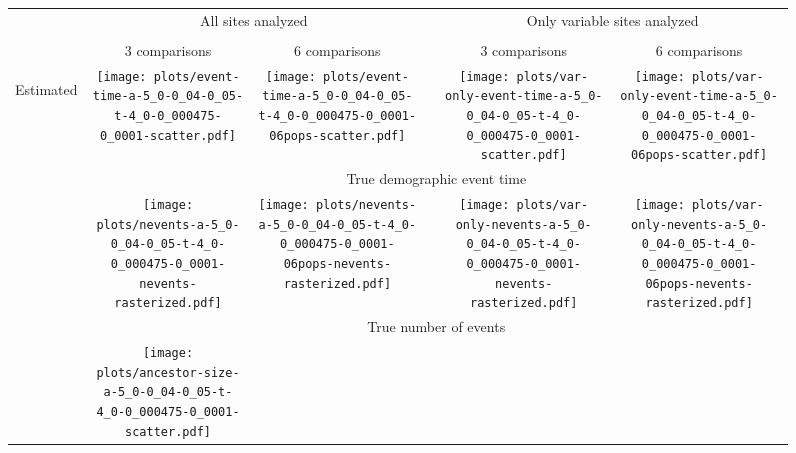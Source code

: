 \documentclass[border=10pt,varwidth=30cm]{standalone}
\begin{document}
\begin{figure}
    \centering
    \begin{tabular}{@{}cccccc@{}}
        & \multicolumn{2}{c}{\Large All sites analyzed}
        &
        & \multicolumn{2}{c}{\Large Only variable sites analyzed} \\
        \cline{2-3}\cline{5-6}
        & & & & & \\
        & \multicolumn{1}{c}{\large 3 comparisons}
        & \multicolumn{1}{c}{\large 6 comparisons}
        &
        & \multicolumn{1}{c}{\large 3 comparisons}
        & \multicolumn{1}{c}{\large 6 comparisons} \\
        \multirow{8}{*}[-9em]{\begin{sideways}\large Estimated\end{sideways}}
        & \texttt{[image: plots/event-time-a-5\_0-0\_04-0\_05-t-4\_0-0\_000475-0\_0001-scatter.pdf]}
        & \texttt{[image: plots/event-time-a-5\_0-0\_04-0\_05-t-4\_0-0\_000475-0\_0001-06pops-scatter.pdf]}
        &
        & \texttt{[image: plots/var-only-event-time-a-5\_0-0\_04-0\_05-t-4\_0-0\_000475-0\_0001-scatter.pdf]}
        & \texttt{[image: plots/var-only-event-time-a-5\_0-0\_04-0\_05-t-4\_0-0\_000475-0\_0001-06pops-scatter.pdf]} \\
        & \multicolumn{5}{c}{\large True demographic event time} \\
        & \texttt{[image: plots/nevents-a-5\_0-0\_04-0\_05-t-4\_0-0\_000475-0\_0001-nevents-rasterized.pdf]}
        & \texttt{[image: plots/nevents-a-5\_0-0\_04-0\_05-t-4\_0-0\_000475-0\_0001-06pops-nevents-rasterized.pdf]}
        &
        & \texttt{[image: plots/var-only-nevents-a-5\_0-0\_04-0\_05-t-4\_0-0\_000475-0\_0001-nevents-rasterized.pdf]}
        & \texttt{[image: plots/var-only-nevents-a-5\_0-0\_04-0\_05-t-4\_0-0\_000475-0\_0001-06pops-nevents-rasterized.pdf]} \\
        & \multicolumn{5}{c}{\large True number of events} \\
        & \texttt{[image: plots/ancestor-size-a-5\_0-0\_04-0\_05-t-4\_0-0\_000475-0\_0001-scatter.pdf]}

\end{tabular}
\end{figure}
\end{document}
